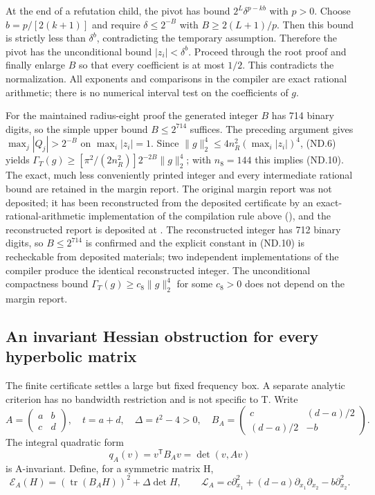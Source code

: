 At the end of a refutation child, the pivot has bound \(2^L\delta^{p-kb}\) with \(p>0\). Choose \(b=p/[2(k+1)]\) and require \(\delta\leq2^{-B}\) with \(B\geq2(L+1)/p\). Then this bound is strictly less than \(\delta^b\), contradicting the temporary assumption. Therefore the pivot has the unconditional bound \(|z_i|<\delta^b\). Proceed through the root proof and finally enlarge \(B\) so that every coefficient is at most \(1/2\). This contradicts the normalization. All exponents and comparisons in the compiler are exact rational arithmetic; there is no numerical interval test on the coefficients of \(g\).

For the maintained radius-eight proof the generated integer \(B\) has 714 binary digits, so the simple upper bound \(B\leq2^{714}\) suffices. The preceding argument gives \(\max_j|Q_j|>2^{-B}\) on \(\max_i|z_i|=1\). Since \(\|g\|_2^4\leq4n_R^2(\max_i|z_i|)^4\), (ND.6) yields \(\Gamma_T(g)\geq[\pi^2/(2n_R^2)]2^{-2B}\|g\|_2^4\); with \(n_8=144\) this implies (ND.10). The exact, much less conveniently printed integer and every intermediate rational bound are retained in the margin report. The original margin report was not deposited; it has been reconstructed from the deposited certificate by an exact-rational-arithmetic implementation of the compilation rule above (), and the reconstructed report is deposited at . The reconstructed integer has 712 binary digits, so \(B\leq2^{714}\) is confirmed and the explicit constant in (ND.10) is recheckable from deposited materials; two independent implementations of the compiler produce the identical reconstructed integer. The unconditional compactness bound \(\Gamma_T(g)\geq c_8\|g\|_2^4\) for some \(c_8>0\) does not depend on the margin report.

\subsection{An invariant Hessian obstruction for every hyperbolic matrix}\label{nondegeneracy:an-invariant-hessian-obstruction-for-every-hyperbolic-matrix}

The finite certificate settles a large but fixed frequency box. A separate analytic criterion has no bandwidth restriction and is not specific to T. Write \[
 A=\begin{pmatrix}a&b\\c&d\end{pmatrix},\quad t=a+d,\quad
 \Delta=t^2-4>0,\quad
 B_A=\begin{pmatrix}c&(d-a)/2\\(d-a)/2&-b\end{pmatrix}.
\] The integral quadratic form \[
 q_A(v)=v^{\mathsf T}B_Av=\det(v,Av)
\] is A-invariant. Define, for a symmetric matrix H, \[
 \mathcal E_A(H)=(\operatorname{tr}(B_AH))^2+\Delta\det H,
 \qquad
 \mathcal L_A=c\partial_{x_1}^2+(d-a)\partial_{x_1}\partial_{x_2}
                                  -b\partial_{x_2}^2.       \tag{ND.11}
\]


